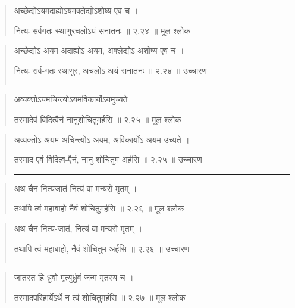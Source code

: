 \begin{quotation}

अच्छेद्योऽयमदाह्योऽयमक्लेद्योऽशोष्य एव च  ।  

नित्यः सर्वगतः स्थाणुरचलोऽयं सनातनः  ॥ २.२४ ॥  मूल श्लोक
\end{quotation}

\begin{quotation}

अच्छेद्योऽ अयम अदाह्योऽ अयम, अक्लेद्योऽ अशोष्य एव च  ।  

नित्यः सर्व-गतः स्थाणुर, अचलोऽ अयं सनातनः  ॥ २.२४ ॥  उच्चारण

\noindent\rule{16cm}{0.4pt} 
\end{quotation}


\begin{quotation}

अव्यक्तोऽयमचिन्त्योऽयमविकार्योऽयमुच्यते  ।  

तस्मादेवं विदित्वैनं नानुशोचितुमर्हसि  ॥ २.२५ ॥  मूल श्लोक
\end{quotation}

\begin{quotation}

अव्यक्तोऽ अयम अचिन्त्योऽ अयम, अविकार्योऽ अयम उच्यते  ।  

तस्माद एवं विदित्व-एैनं, नानु शोचितुम अर्हसि  ॥ २.२५ ॥  उच्चारण

\noindent\rule{16cm}{0.4pt} 
\end{quotation}


\begin{quotation}

अथ चैनं नित्यजातं नित्यं वा मन्यसे मृतम्‌  ।  

तथापि त्वं महाबाहो नैवं शोचितुमर्हसि  ॥ २.२६ ॥  मूल श्लोक
\end{quotation}

\begin{quotation}

अथ चैनं नित्य-जातं, नित्यं वा मन्यसे मृतम्‌  ।  

तथापि त्वं महाबाहो, नैवं शोचितुम अर्हसि  ॥ २.२६ ॥  उच्चारण

\noindent\rule{16cm}{0.4pt} 
\end{quotation}


\begin{quotation}

जातस्त हि ध्रुवो मृत्युर्ध्रुवं जन्म मृतस्य च  ।  

तस्मादपरिहार्येऽर्थे न त्वं शोचितुमर्हसि  ॥ २.२७ ॥  मूल श्लोक
\end{quotation}

